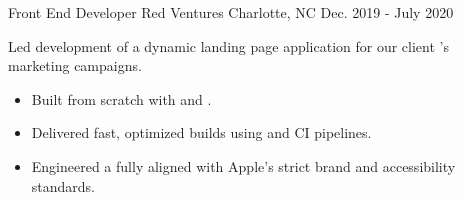 \begin{cventries}
  \cventry
    {Front End Developer} %
    {Red Ventures} %
    {Charlotte, NC} %
    {Dec. 2019 - July 2020} %
    {
      \begin{cvitems} %
        \item {Led development of a dynamic landing page application for our client 's marketing campaigns.}
        \begin{itemize}[leftmargin=2.5ex, itemsep=.8mm]
          \vspace{.8mm}
          \item {Built from scratch with  and .}
          \item {Delivered fast, optimized builds using  and CI pipelines.}
          \item {Engineered a  fully aligned with Apple's strict brand and accessibility standards.}
          \vspace{.3mm}
        \end{itemize}
      \end{cvitems}
    }


\end{cventries}
